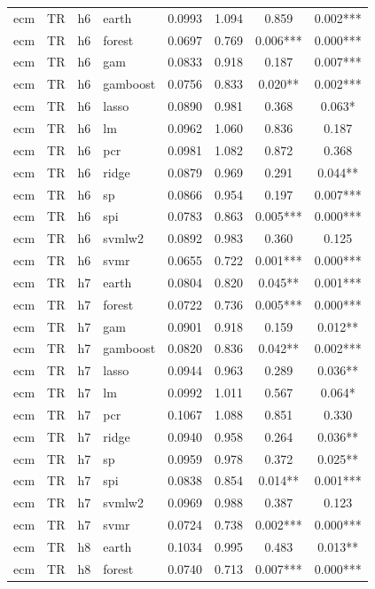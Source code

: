 \begin{ThreePartTable}
\begin{longtable}[t]{llclcccc}
\addlinespace
ecm & TR & h6 & earth & 0.0993 & 1.094 & 0.859 & 0.002***\\
ecm & TR & h6 & forest & 0.0697 & 0.769 & 0.006*** & 0.000***\\
ecm & TR & h6 & gam & 0.0833 & 0.918 & 0.187 & 0.007***\\
ecm & TR & h6 & gamboost & 0.0756 & 0.833 & 0.020** & 0.002***\\
ecm & TR & h6 & lasso & 0.0890 & 0.981 & 0.368 & 0.063*\\
ecm & TR & h6 & lm & 0.0962 & 1.060 & 0.836 & 0.187\\
ecm & TR & h6 & pcr & 0.0981 & 1.082 & 0.872 & 0.368\\
ecm & TR & h6 & ridge & 0.0879 & 0.969 & 0.291 & 0.044**\\
ecm & TR & h6 & sp & 0.0866 & 0.954 & 0.197 & 0.007***\\
ecm & TR & h6 & spi & 0.0783 & 0.863 & 0.005*** & 0.000***\\
ecm & TR & h6 & svmlw2 & 0.0892 & 0.983 & 0.360 & 0.125\\
ecm & TR & h6 & svmr & 0.0655 & 0.722 & 0.001*** & 0.000***\\
\addlinespace
ecm & TR & h7 & earth & 0.0804 & 0.820 & 0.045** & 0.001***\\
ecm & TR & h7 & forest & 0.0722 & 0.736 & 0.005*** & 0.000***\\
ecm & TR & h7 & gam & 0.0901 & 0.918 & 0.159 & 0.012**\\
ecm & TR & h7 & gamboost & 0.0820 & 0.836 & 0.042** & 0.002***\\
ecm & TR & h7 & lasso & 0.0944 & 0.963 & 0.289 & 0.036**\\
ecm & TR & h7 & lm & 0.0992 & 1.011 & 0.567 & 0.064*\\
ecm & TR & h7 & pcr & 0.1067 & 1.088 & 0.851 & 0.330\\
ecm & TR & h7 & ridge & 0.0940 & 0.958 & 0.264 & 0.036**\\
ecm & TR & h7 & sp & 0.0959 & 0.978 & 0.372 & 0.025**\\
ecm & TR & h7 & spi & 0.0838 & 0.854 & 0.014** & 0.001***\\
ecm & TR & h7 & svmlw2 & 0.0969 & 0.988 & 0.387 & 0.123\\
ecm & TR & h7 & svmr & 0.0724 & 0.738 & 0.002*** & 0.000***\\
\addlinespace
ecm & TR & h8 & earth & 0.1034 & 0.995 & 0.483 & 0.013**\\
ecm & TR & h8 & forest & 0.0740 & 0.713 & 0.007*** & 0.000***\\

\end{longtable}
\end{ThreePartTable}
